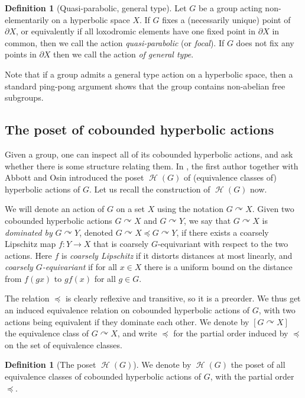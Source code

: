 \documentclass[reqno,12pt]{amsart}\setcounter{tocdepth}{1}
\theoremstyle{definition}
\newtheorem{definition}[theorem]{Definition}
\DeclareMathOperator{\Hyp}{\mathcal{H}}
\numberwithin{equation}{section}
\begin{document}
\begin{definition}[Quasi-parabolic, general type]
Let $G$ be a group acting non-elementarily on a hyperbolic space $X$. If $G$ fixes a (necessarily unique) point of $\partial X$, or equivalently if all loxodromic elements have one fixed point in $\partial X$ in common, then we call the action \emph{quasi-parabolic} (or \emph{focal}). If $G$ does not fix any points in $\partial X$ then we call the action \emph{of general type}.
\end{definition}

Note that if a group admits a general type action on a hyperbolic space, then a standard ping-pong argument shows that the group contains non-abelian free subgroups.


\subsection{The poset of cobounded hyperbolic actions}\label{ssec:poset}

Given a group, one can inspect all of its cobounded hyperbolic actions, and ask whether there is some structure relating them. In \cite{ABO}, the first author together with Abbott and Osin introduced the poset $\Hyp(G)$ of (equivalence classes of) hyperbolic actions of $G$. Let us recall the construction of $\Hyp(G)$ now.

We will denote an action of $G$ on a set $X$ using the notation $G \curvearrowright X$. Given two cobounded hyperbolic actions $G\curvearrowright X$ and $G\curvearrowright Y$, we say that $G\curvearrowright X$ is \emph{dominated by} $G\curvearrowright Y$, denoted $G\curvearrowright X \preceq G\curvearrowright Y$, if there exists a coarsely Lipschitz map $f\colon Y\to X$ that is coarsely $G$-equivariant with respect to the two actions. Here $f$ is \emph{coarsely Lipschitz} if it distorts distances at most linearly, and \emph{coarsely $G$-equivariant} if for all $x\in X$ there is a uniform bound on the distance from $f(gx)$ to $gf(x)$ for all $g\in G$.

The relation $\preceq$ is clearly reflexive and transitive, so it is a preorder. We thus get an induced equivalence relation on cobounded hyperbolic actions of $G$, with two actions being equivalent if they dominate each other. We denote by $[G\curvearrowright X]$ the equivalence class of $G\curvearrowright X$, and write $\preccurlyeq$ for the partial order induced by $\preceq$ on the set of equivalence classes.

\begin{definition}[The poset $\Hyp(G)$]
We denote by $\Hyp(G)$ the poset of all equivalence classes of cobounded hyperbolic actions of $G$, with the partial order $\preccurlyeq$.
\end{definition}
\end{document}
